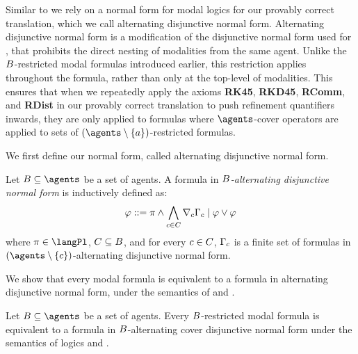 Similar to \axiomRmlK{} we rely on a normal form for modal logics for our provably correct translation, which we call alternating disjunctive normal form.
Alternating disjunctive normal form is a modification of the disjunctive normal form used for \axiomRmlK{}, that prohibits the direct nesting of modalities from the same agent.
Unlike the $B$-restricted modal formulas introduced earlier, this restriction applies throughout the formula, rather than only at the top-level of modalities.
This ensures that when we repeatedly apply the axioms {\bf RK45}, {\bf RKD45}, {\bf RComm}, and {\bf RDist} in our provably correct translation to push refinement quantifiers inwards, they are only applied to formulas where $\agents$-cover operators are applied to sets of $(\agents \setminus \{\agentA\})$-restricted formulas.

We first define our normal form, called alternating disjunctive normal form.

\begin{definition}\label{adnf}
Let $\agentsB \subseteq \agents$ be a set of agents.
A formula in {\em $B$-alternating disjunctive normal form} is inductively defined as:
$$
\varphi ::= \pi \land \bigwedge_{c \in C} \nabla_{c} \Gamma_c \mid \varphi \lor \varphi
$$
where $\pi \in \langPl$, $C \subseteq B$, and for every $c \in C$, $\Gamma_c$ is a finite set of formulas in $(\agents \setminus \{\agentC\})$-alternating disjunctive normal form.
\end{definition}

We show that every modal formula is equivalent to a formula in alternating disjunctive normal form, under the semantics of \logicKFF{} and \logicKD{}. 

\begin{lemma}\label{adnf-equivalent}
Let $\agentsB \subseteq \agents$ be a set of agents.
Every $B$-restricted modal formula is equivalent to a formula in $B$-alternating cover disjunctive normal form under the semantics of logics \logicKFF{} and \logicKD{}.
\end{lemma}

